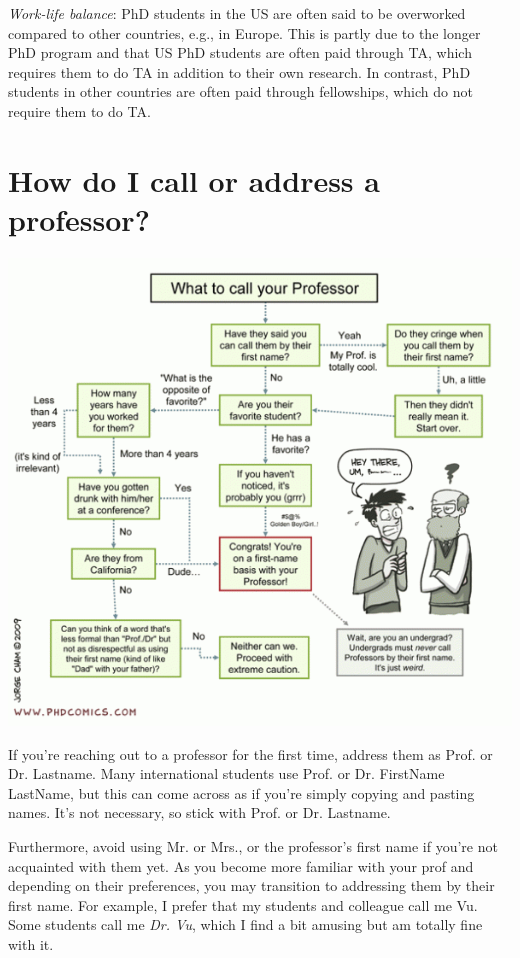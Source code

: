 \documentclass[oneside,11pt]{memoir}
\begin{document}
\emph{Work-life balance}: PhD students in the US are often said to be overworked compared to other countries, e.g., in Europe.  This is partly due to the longer PhD program and that US PhD students are often paid through TA, which requires them to do TA in addition to their own research. In contrast, PhD students in other countries are often paid through fellowships, which do not require them to do TA.



\section{How do I call or address a professor?}\label{sec:address}

\begin{center}
  \includegraphics[scale=0.5]{files/c5.png}
\end{center}

If you're reaching out to a professor for the first time,  address them as Prof. or Dr. Lastname. Many international students use Prof. or Dr. FirstName LastName, but this can come across as if you're simply copying and pasting names. It's not necessary, so stick with Prof. or Dr. Lastname.


Furthermore, avoid using Mr. or Mrs., or the professor's first name if you're not acquainted with them yet.  As you become more familiar with your prof and depending on their preferences, you may transition to addressing them by their first name.
For example, I prefer that my students and colleague call me Vu. Some students call me \emph{Dr. Vu}, which I find a bit amusing but am totally fine with it. 
\end{document}
